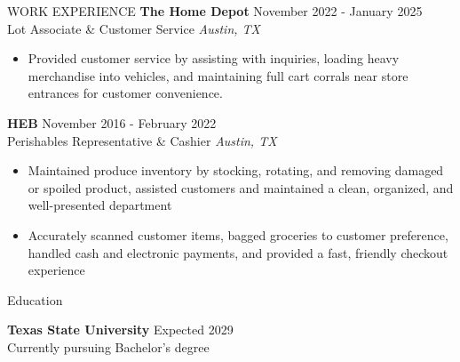 \documentclass{resume} %
\begin{document}
\begin{rSection}{WORK EXPERIENCE}
\textbf{The Home Depot} \hfill November 2022 - January 2025 \\
Lot Associate \& Customer Service \hfill \textit{Austin, TX}
\begin{itemize}
   \item Provided customer service by assisting with inquiries, loading heavy merchandise into vehicles, and maintaining full cart corrals near store entrances for customer convenience.
\end{itemize}

\textbf{HEB} \hfill November 2016 - February 2022 \\
Perishables Representative \& Cashier \hfill \textit{Austin, TX}
\begin{itemize}
   \item Maintained produce inventory by stocking, rotating, and removing damaged or spoiled product, assisted customers and maintained a clean, organized, and well-presented department
   \item Accurately scanned customer items, bagged groceries to customer preference, handled cash and electronic payments, and provided a fast, friendly checkout experience
\end{itemize}
\end{rSection} 


\begin{rSection}{Education}

{\bf Texas State University} \hfill {Expected 2029} \\
Currently pursuing Bachelor's degree



\end{rSection}
\end{document}
